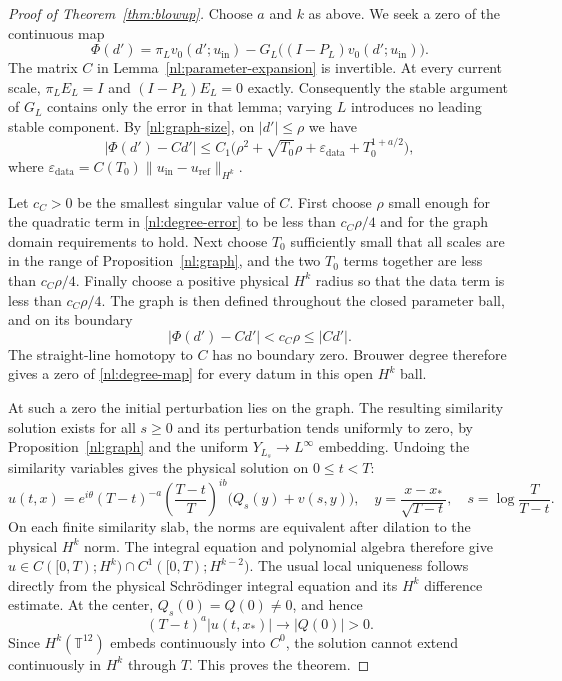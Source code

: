 \begin{proof}[Proof of Theorem~\ref{thm:blowup}]
Choose $a$ and $k$ as above. We seek a zero of the continuous map
\begin{equation}\label{nl:degree-map}
 \Phi(d')=\pi_Lv_0(d';u_{\mathrm{in}})
       -G_L\bigl((I-P_L)v_0(d';u_{\mathrm{in}})\bigr).
\end{equation}
The matrix $C$ in Lemma~\ref{nl:parameter-expansion} is invertible.
At every current scale, $\pi_LE_L=I$ and $(I-P_L)E_L=0$ exactly.
Consequently the stable argument of $G_L$ contains only the error in
that lemma; varying $L$ introduces no leading stable component.
By \eqref{nl:graph-size}, on $|d'|\leq\rho$ we have
\begin{equation}\label{nl:degree-error}
 |\Phi(d')-Cd'|
 \leq C_1\bigl(\rho^2+\sqrt{T_0}\rho
                   +\varepsilon_{\mathrm{data}}+T_0^{1+a/2}\bigr),
\end{equation}
where
$\varepsilon_{\mathrm{data}}=C(T_0)
\|u_{\mathrm{in}}-u_{\mathrm{ref}}\|_{H^k}$.

Let $c_C>0$ be the smallest singular value of $C$.
First choose $\rho$ small enough for the quadratic term in
\eqref{nl:degree-error} to be less than $c_C\rho/4$ and for the graph
domain requirements to hold. Next choose $T_0$ sufficiently small that
all scales are in the range of Proposition~\ref{nl:graph}, and the two
$T_0$ terms together are less than $c_C\rho/4$.
Finally choose a positive physical $H^k$ radius so that the data term
is less than $c_C\rho/4$. The graph is then defined throughout the
closed parameter ball, and on its boundary
\[
 |\Phi(d')-Cd'|<c_C\rho\leq |Cd'|.
\]
The straight-line homotopy to $C$ has no boundary zero. Brouwer degree
therefore gives a zero of \eqref{nl:degree-map} for every datum in this
open $H^k$ ball.

At such a zero the initial perturbation lies on the graph. The resulting
similarity solution exists for all $s\geq0$ and its perturbation tends
uniformly to zero, by Proposition~\ref{nl:graph} and the uniform
$Y_{L_s}\to L^\infty$ embedding. Undoing the similarity variables gives
the physical solution on $0\leq t<T$:
\[
 u(t,x)=e^{i\theta}(T-t)^{-a}
       \left(\frac{T-t}{T}\right)^{ib}
       \bigl(Q_s(y)+v(s,y)\bigr),
 \quad y=\frac{x-x_*}{\sqrt{T-t}},\quad
 s=\log\frac{T}{T-t}.
\]
On each finite similarity slab, the norms are equivalent after dilation
to the physical $H^k$ norm. The integral equation and polynomial algebra
therefore give $u\in C([0,T);H^k)\cap C^1([0,T);H^{k-2})$.
The usual local uniqueness follows directly from the physical
Schr\"odinger integral equation and its $H^k$ difference estimate.
At the center, $Q_s(0)=Q(0)\ne0$, and hence
\[
 (T-t)^a|u(t,x_*)|\longrightarrow |Q(0)|>0.
\]
Since $H^k(\mathbb T^{12})$ embeds continuously into $C^0$, the solution
cannot extend continuously in $H^k$ through $T$. This proves the theorem.
\end{proof}

